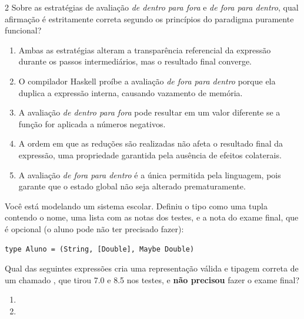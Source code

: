 \documentclass[a4paper,10pt,brazil]{article}
\begin{document}
\begin{multicols}{2}
Sobre as estratégias de avaliação \emph{de dentro para fora} e \emph{de fora para dentro}, qual afirmação é estritamente correta segundo os princípios do paradigma puramente funcional?

\begin{enumerate}
  \item Ambas as estratégias alteram a transparência referencial da expressão durante os passos intermediários, mas o resultado final converge.

  \item O compilador Haskell proíbe a avaliação \emph{de fora para dentro} porque ela duplica a expressão interna, causando vazamento de memória.

  \item A avaliação \emph{de dentro para fora} pode resultar em um valor diferente se a função  for aplicada a números negativos.

  \item A ordem em que as reduções são realizadas não afeta o resultado final da expressão, uma propriedade garantida pela ausência de efeitos colaterais.

  \item A avaliação \emph{de fora para dentro} é a única permitida pela linguagem, pois garante que o estado global não seja alterado prematuramente.


\end{enumerate}

Você está modelando um sistema escolar. Definiu o tipo  como uma tupla contendo o nome, uma lista com as notas dos testes, e a nota do exame final, que é opcional (o aluno pode não ter precisado fazer):
\begin{verbatim}
type Aluno = (String, [Double], Maybe Double)
\end{verbatim}

Qual das seguintes expressões cria uma representação válida e tipagem correta de um  chamado , que tirou 7.0 e 8.5 nos testes, e \textbf{não precisou} fazer o exame final?

\begin{enumerate}
  \item {}

  \item {}


\end{enumerate}
\end{multicols}
\end{document}
